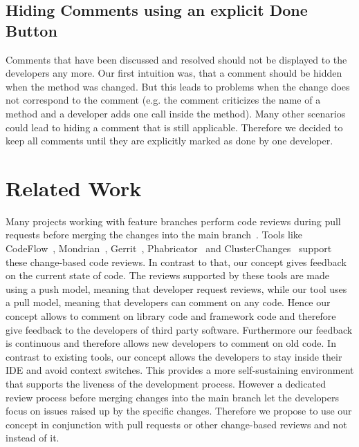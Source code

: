 \documentclass[10pt, conference]{IEEEtran}
\begin{document}
\subsection{Hiding Comments using an explicit Done Button}
Comments that have been discussed and resolved should not be displayed to the developers any more. 
%
Our first intuition was, that a comment should be hidden when the method was changed. 
%
But this leads to problems when the change does not correspond to the comment (e.g. the comment criticizes the name of a method and a developer adds one call inside the method). 
%
Many other scenarios could lead to hiding a comment that is still applicable. 
%
Therefore we decided to keep all comments until they are explicitly marked as done by one developer.  

\section{Related Work}
Many projects working with feature branches perform code reviews during pull requests before merging the changes into the main branch~\cite{driessen2010successful, calefato2015PLE, yu2015pullrequests, tsay2014contributionGithub, gousios2014PullBasedSD, rahman2014pullrequests, tsay2014ContributionDiscussion}. 
%
Tools like CodeFlow~\cite{bird2015CodeReviewPlatform}, Mondrian~\cite{kennedy2006Mondrian}, Gerrit~\cite{google2016gerrit},  Phabricator~\cite{tsotsis2011Phabricator} and ClusterChanges~\cite{barnett2015helpingdevelopers} support these change-based code reviews.
%
In contrast to that, our concept gives feedback on the current state of code. 
%
The reviews supported by these tools are made using a push model, meaning that developer request reviews, while our tool uses a pull model, meaning that developers can comment on any code.
%
Hence our concept allows to comment on library code and framework code and therefore give feedback to the developers of third party software. 
%
Furthermore our feedback is continuous and therefore allows new developers to comment on old code. 
%
In contrast to existing tools, our concept allows the developers to stay inside their IDE and avoid context switches. 
%
This provides a more self-sustaining environment that supports the liveness of the development process. 
%
However a dedicated review process before merging changes into the main branch let the developers focus on issues raised up by the specific changes. 
%
Therefore we propose to use our concept in conjunction with pull requests or	 other change-based reviews and not instead of it.
%
\\
\end{document}
